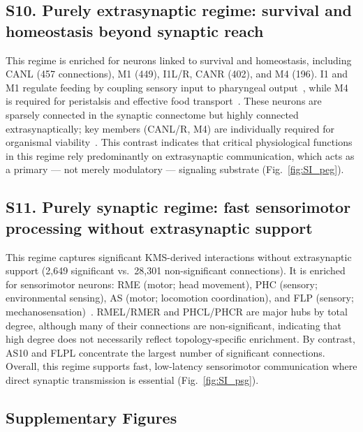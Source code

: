 \subsection*{S10.\; Purely extrasynaptic regime: survival and homeostasis beyond synaptic
reach}

This regime is enriched for neurons linked to survival and homeostasis, including CANL
(457 connections), M1 (449), I1L/R, CANR (402), and M4 (196). I1 and M1 regulate feeding
by coupling sensory input to pharyngeal
output~\cite{wormatlas2023,trojanowski2014neural,bhatla2015light}, while M4 is required
for peristalsis and effective food transport~\cite{wormatlas2023,trojanowski2014neural,
song2012serotonin}. These neurons are sparsely connected in the synaptic connectome but
highly connected extrasynaptically; key members (CANL/R, M4) are individually required
for organismal viability~\cite{chien2019enigmatic}. This contrast indicates that critical
physiological functions in this regime rely predominantly on extrasynaptic communication,
which acts as a primary --- not merely modulatory --- signaling substrate
(Fig.~\ref{fig:SI_peg}).

\subsection*{S11.\; Purely synaptic regime: fast sensorimotor processing without
extrasynaptic support}

This regime captures significant KMS-derived interactions without extrasynaptic support
(2,649 significant vs.\ 28,301 non-significant connections). It is enriched for
sensorimotor neurons: RME (motor; head movement), PHC (sensory; environmental sensing),
AS (motor; locomotion coordination), and FLP (sensory;
mechanosensation)~\cite{kaplan1993,wormatlas2023,bhattacharya2019plasticity,altun2009high,
wang2024neurotransmitter,pereira2015cellular,tolstenkov2018functionally}. RMEL/RMER and
PHCL/PHCR are major hubs by total degree, although many of their connections are
non-significant, indicating that high degree does not necessarily reflect
topology-specific enrichment. By contrast, AS10 and FLPL concentrate the largest number
of significant connections. Overall, this regime supports fast, low-latency sensorimotor
communication where direct synaptic transmission is essential (Fig.~\ref{fig:SI_psg}).

\subsection*{Supplementary Figures}

